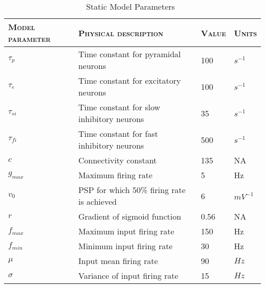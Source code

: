 \begin{center}%
	\begin{table}
			\caption{Static Model Parameters~\citep{wendling2002epileptic}}
		\begin{tabular}{||p{4cm}|p{6cm}|p{1.5cm}|p{1.2cm}||}\hline
			 \textsc{Model parameter}  & \textsc{Physical description} & \textsc{Value} & \textsc{Units}  \\\hline\hline
			 $\tau_{p}$ & Time constant for pyramidal neurons & 100 & $s^{-1}$\\\hline
			 $\tau_{e}$ & Time constant for excitatory neurons & 100 & $s^{-1}$\\\hline
			 $\tau_{si}$ & Time constant for slow inhibitory neurons & 35 & $s^{-1}$\\\hline
			 $\tau_{fi}$ & Time constant for fast inhibitory neurons & 500 & $s^{-1}$\\\hline
			 $c$ & Connectivity constant & 135 & NA\\\hline
			 $g_{max}$ & Maximum firing rate & 5 & Hz \\\hline
			 $v_{0}$ & PSP for which 50\% firing rate is achieved & 6 & $mV^{-1}$\\\hline
			 $r$ & Gradient of sigmoid function & 0.56 & NA \\\hline
			 $f_{max}$ & Maximum input firing rate & 150 & Hz \\\hline
			 $f_{min}$ & Minimum input firing rate & 30 & Hz \\\hline
			 $\mu$ & Input mean firing rate & 90 & $Hz$\\\hline
			 $\sigma$ & Variance of input firing rate & 15 & $Hz$\\\hline\hline 
		\end{tabular}
		\label{tab: Static}
	\end{table}
\end{center}%
